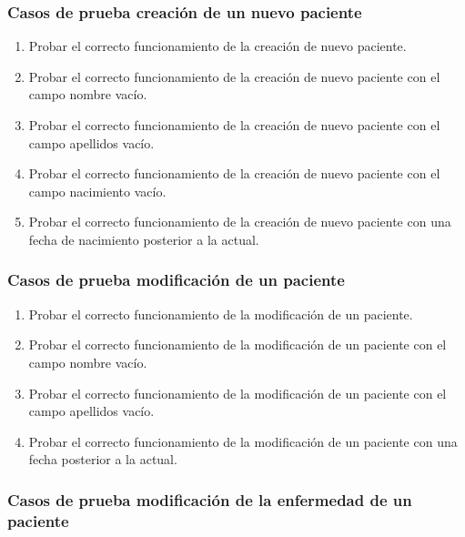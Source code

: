 \subsubsection{Casos de prueba creación de un nuevo paciente}

\begin{enumerate}
    \item Probar el correcto funcionamiento de la creación de nuevo paciente.
    \item Probar el correcto funcionamiento de la creación de nuevo paciente con el campo nombre vacío.
    \item Probar el correcto funcionamiento de la creación de nuevo paciente con el campo apellidos vacío.
    \item Probar el correcto funcionamiento de la creación de nuevo paciente con el campo nacimiento vacío.
    \item Probar el correcto funcionamiento de la creación de nuevo paciente con una fecha de nacimiento posterior a la actual.
\end{enumerate}

\subsubsection{Casos de prueba modificación de un paciente}

\begin{enumerate}
    \item Probar el correcto funcionamiento de la modificación de un paciente.
    \item Probar el correcto funcionamiento de la modificación de un paciente con el campo nombre vacío.
    \item Probar el correcto funcionamiento de la modificación de un paciente con el campo apellidos vacío.
    \item Probar el correcto funcionamiento de la modificación de un paciente con una fecha posterior a la actual.
\end{enumerate}

\subsubsection{Casos de prueba modificación de la enfermedad de un paciente}

